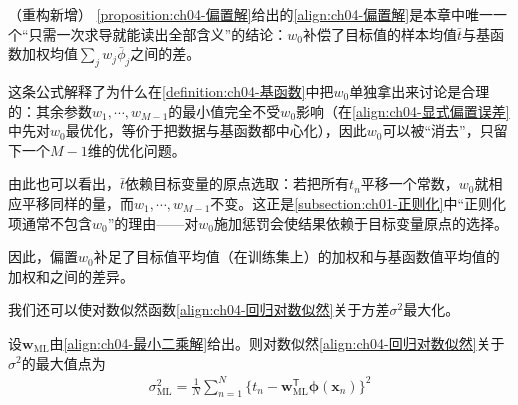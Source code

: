 \documentclass[../../main.tex]{subfiles}
\begin{document}
\begin{remark}（重构新增）
\cref{proposition:ch04-偏置解}给出的\eqref{align:ch04-偏置解}是本章中唯一一个“只需一次求导就能读出全部含义”的结论：$w_0$补偿了目标值的样本均值$\bar{t}$与基函数加权均值$\sum_jw_j\bar{\phi}_j$之间的差。

这条公式解释了为什么在\cref{definition:ch04-基函数}中把$w_0$单独拿出来讨论是合理的：其余参数$w_1,\cdots,w_{M-1}$的最小值完全不受$w_0$影响（在\eqref{align:ch04-显式偏置误差}中先对$w_0$最优化，等价于把数据与基函数都中心化），因此$w_0$可以被“消去”，只留下一个$M-1$维的优化问题。

由此也可以看出，$\bar{t}$依赖目标变量的原点选取：若把所有$t_n$平移一个常数，$w_0$就相应平移同样的量，而$w_1,\cdots,w_{M-1}$不变。这正是\cref{subsection:ch01-正则化}中“正则化项通常不包含$w_0$”的理由——对$w_0$施加惩罚会使结果依赖于目标变量原点的选择。
\end{remark}

因此，偏置$w_0$补足了目标值平均值（在训练集上）的加权和与基函数值平均值的加权和之间的差异。

我们还可以使对数似然函数\eqref{align:ch04-回归对数似然}关于方差$\sigma^2$最大化。

\begin{proposition}[方差的最大似然解]\label{proposition:ch04-方差最大似然}
设$\boldsymbol{w}_{\mathrm{ML}}$由\eqref{align:ch04-最小二乘解}给出。则对数似然\eqref{align:ch04-回归对数似然}关于$\sigma^2$的最大值点为
\begin{align}
  \sigma^2_{\mathrm{ML}}=\frac{1}{N}\sum_{n=1}^{N}\bigl\{t_n-\boldsymbol{w}_{\mathrm{ML}}^{\mathsf{T}}\boldsymbol{\phi}(\boldsymbol{x}_n)\bigr\}^2
  \label{align:ch04-方差ML}
\end{align}
\end{proposition}
\end{document}
